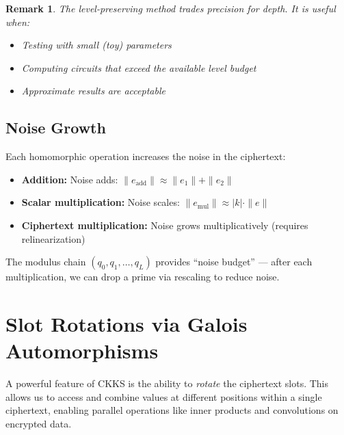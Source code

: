 \documentclass[11pt,a4paper]{article}
\newtheorem{remark}{Remark}
\begin{document}
\begin{remark}
The level-preserving method trades precision for depth. It is useful when:
\begin{itemize}
    \item Testing with small (toy) parameters
    \item Computing circuits that exceed the available level budget
    \item Approximate results are acceptable
\end{itemize}
\end{remark}

\subsection{Noise Growth}

Each homomorphic operation increases the noise in the ciphertext:

\begin{itemize}
    \item \textbf{Addition:} Noise adds: $\|e_{\text{add}}\| \approx \|e_1\| + \|e_2\|$
    \item \textbf{Scalar multiplication:} Noise scales: $\|e_{\text{mul}}\| \approx |k| \cdot \|e\|$
    \item \textbf{Ciphertext multiplication:} Noise grows multiplicatively (requires relinearization)
\end{itemize}

The modulus chain $(q_0, q_1, \ldots, q_L)$ provides ``noise budget'' — after each multiplication, we can drop a prime via rescaling to reduce noise.

\section{Slot Rotations via Galois Automorphisms}

A powerful feature of CKKS is the ability to \emph{rotate} the ciphertext slots. This allows us to access and combine values at different positions within a single ciphertext, enabling parallel operations like inner products and convolutions on encrypted data.

\end{document}

